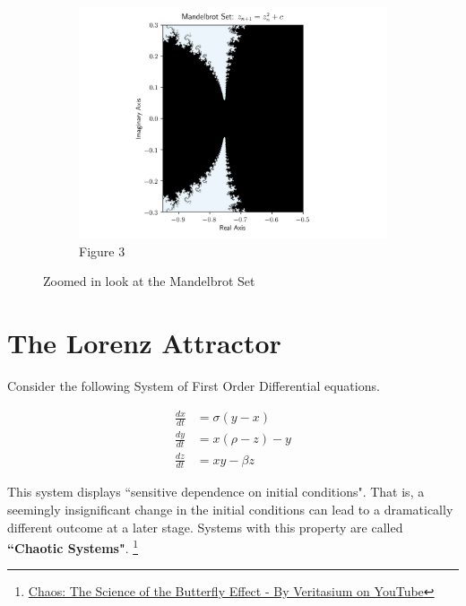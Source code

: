 \documentclass[14pts]{article}
\begin{document}
    \begin{figure}\ContinuedFloat
        \begin{subfigure}{\textwidth}
            \includegraphics[width = \textwidth]{Images/Mandelbrot_section3.png}
            \caption{Figure 3}
        \end{subfigure}
        \caption{Zoomed in look at the Mandelbrot Set}
    \end{figure}

    \pagebreak


    \section{The Lorenz Attractor}
    Consider the following System of First Order Differential equations.

    \begin{align}
        \frac{dx}{dt} &= \sigma (y-x) \\
        \frac{dy}{dt} &= x(\rho-z) - y \\
        \frac{dz}{dt} &= xy - \beta z
    \end{align}


    This system displays ``sensitive dependence on initial conditions". That is, a seemingly insignificant change in the initial conditions can lead to a dramatically different outcome at a later stage.
    Systems with this property are called \textbf{``Chaotic Systems"}. \footnote[2]{\href{https://www.youtube.com/watch?v=fDek6cYijxI&ab_channel=Veritasium}{Chaos: The Science of the Butterfly Effect - By Veritasium on YouTube}}
\end{document}

